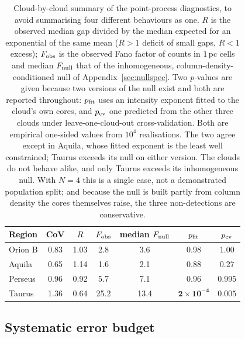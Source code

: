 \documentclass[usenatbib,twoside,twocolumn]{mnras}
\begin{document}
\begin{table}
\caption{Cloud-by-cloud summary of the point-process diagnostics, to avoid summarising four different behaviours as one. $R$ is the observed median gap divided by the median expected for an exponential of the same mean ($R>1$ deficit of small gaps, $R<1$ excess); $F_{\rm obs}$ is the observed Fano factor of counts in $1$\,pc cells and median $F_{\rm null}$ that of the inhomogeneous, column-density-conditioned null of Appendix~\ref{sec:nullspec}. Two $p$-values are given because two versions of the null exist and both are reported throughout: $p_{\rm fit}$ uses an intensity exponent fitted to the cloud's own cores, and $p_{\rm cv}$ one predicted from the other three clouds under leave-one-cloud-out cross-validation. Both are empirical one-sided values from $10^4$ realisations. The two agree except in Aquila, whose fitted exponent is the least well constrained; Taurus exceeds its null on either version. The clouds do not behave alike, and only Taurus exceeds its inhomogeneous null. With $N=4$ this is a single case, not a demonstrated population split; and because the null is built partly from column density the cores themselves raise, the three non-detections are conservative.}
\label{tab:percloud}
\footnotesize
\setlength{\tabcolsep}{3.5pt}
\begin{tabular}{lcccccc}
\toprule
Region & CoV & $R$ & $F_{\rm obs}$ & median $F_{\rm null}$ & $p_{\rm fit}$ & $p_{\rm cv}$ \\
\midrule
Orion B & 0.83 & 1.03 & 2.8  & 3.6  & 0.98 & 1.00 \\
Aquila  & 0.65 & 1.14 & 1.6  & 2.1  & 0.88 & 0.27 \\
Perseus & 0.96 & 0.92 & 5.7  & 7.1  & 0.96 & 0.995 \\
Taurus  & 1.36 & 0.64 & 25.2 & 13.4 & $\mathbf{2\times10^{-4}}$ & $\mathbf{0.005}$ \\
\bottomrule
\end{tabular}
\end{table}

\subsection{Systematic error budget}
\label{sec:error_budget}
\end{document}
